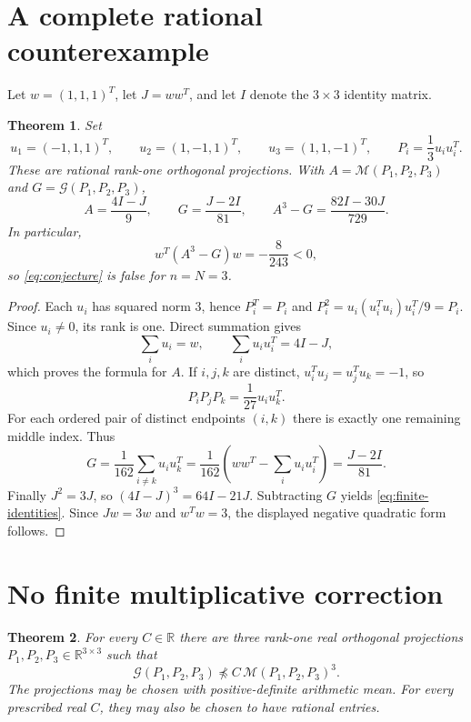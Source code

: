 \documentclass[11pt]{article}
\newtheorem{theorem}{Theorem}
\newcommand{\R}{\mathbb R}
\newcommand{\G}{\mathcal G}
\newcommand{\M}{\mathcal M}
\begin{document}
\section{A complete rational counterexample}

Let $w=(1,1,1)^T$, let $J=ww^T$, and let $I$ denote the $3\times3$ identity matrix.

\begin{theorem}\label{thm:finite}
Set
\[
 u_1=(-1,1,1)^T,\qquad u_2=(1,-1,1)^T,\qquad u_3=(1,1,-1)^T,
 \qquad P_i=\frac13u_i u_i^T.
\]
These are rational rank-one orthogonal projections. With $A=\M(P_1,P_2,P_3)$ and $G=\G(P_1,P_2,P_3)$,
\begin{equation}\label{eq:finite-identities}
 A=\frac{4I-J}{9},\qquad
 G=\frac{J-2I}{81},\qquad
 A^3-G=\frac{82I-30J}{729}.
\end{equation}
In particular,
\[
 w^T(A^3-G)w=-\frac8{243}<0,
\]
so \eqref{eq:conjecture} is false for $n=N=3$.
\end{theorem}

\begin{proof}
Each $u_i$ has squared norm $3$, hence $P_i^T=P_i$ and
$P_i^2=u_i(u_i^Tu_i)u_i^T/9=P_i$. Since $u_i\ne0$, its rank is one.
Direct summation gives
\[
 \sum_i u_i=w,\qquad \sum_i u_i u_i^T=4I-J,
\]
which proves the formula for $A$. If $i,j,k$ are distinct, $u_i^Tu_j=u_j^Tu_k=-1$, so
\[
 P_iP_jP_k=\frac1{27}u_i u_k^T.
\]
For each ordered pair of distinct endpoints $(i,k)$ there is exactly one remaining middle index. Thus
\[
 G=\frac1{162}\sum_{i\ne k}u_i u_k^T
   =\frac1{162}\left(ww^T-\sum_i u_i u_i^T\right)
   =\frac{J-2I}{81}.
\]
Finally $J^2=3J$, so $(4I-J)^3=64I-21J$. Subtracting $G$ yields
\eqref{eq:finite-identities}. Since $Jw=3w$ and $w^Tw=3$, the displayed negative quadratic form follows.
\end{proof}

\section{No finite multiplicative correction}

\begin{theorem}\label{thm:unbounded}
For every $C\in\R$ there are three rank-one real orthogonal projections $P_1,P_2,P_3\in\R^{3\times3}$ such that
\[
 \G(P_1,P_2,P_3)\not\preceq C\,\M(P_1,P_2,P_3)^3.
\]
The projections may be chosen with positive-definite arithmetic mean. For every prescribed real $C$, they may also be chosen to have rational entries.
\end{theorem}
\end{document}
